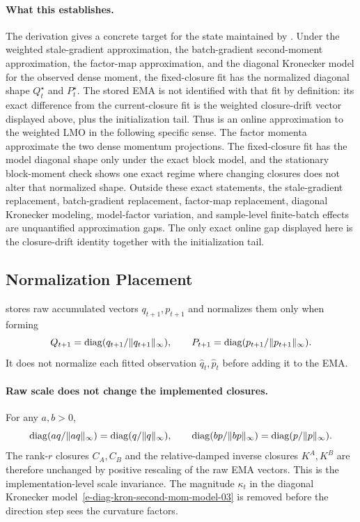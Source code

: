 \paragraph{What this establishes.}
The derivation gives a concrete target for the state maintained by
. Under the weighted stale-gradient approximation, the
batch-gradient second-moment approximation, the factor-map approximation, and
the diagonal Kronecker model for the observed dense moment, the fixed-closure
fit has the normalized diagonal shape $Q^\star_t$ and $P^\star_t$.
The stored EMA is not identified with that fit by definition: its exact
difference from the current-closure fit is the weighted closure-drift vector
displayed above, plus the initialization tail. Thus  is an
online approximation to the weighted LMO in the following specific sense. The
factor momenta approximate the two dense momentum projections. The fixed-closure
fit has the model diagonal shape only under the exact block model, and the
stationary block-moment check shows one exact regime where changing closures
does not alter that normalized shape. Outside these exact statements, the
stale-gradient replacement, batch-gradient replacement, factor-map replacement,
diagonal Kronecker modeling, model-factor variation, and sample-level
finite-batch effects are unquantified approximation gaps. The only exact online
gap displayed here is the closure-drift identity together with the initialization
tail.

\subsection{Normalization Placement}
\label{sec:scale-placement-03}

\methodname{} stores raw accumulated vectors $q_{t+1},p_{t+1}$ and normalizes
them only when forming
\[
  Q_{t+1}=\operatorname{diag}(q_{t+1}/\| q_{t+1}\|_\infty),
  \qquad
  P_{t+1}=\operatorname{diag}(p_{t+1}/\| p_{t+1}\|_\infty).
\]
It does not normalize each fitted observation $\hat q_t,\hat p_t$ before
adding it to the EMA.

\paragraph{Raw scale does not change the implemented closures.}
For any $a,b>0$,
\[
  \operatorname{diag}(aq/\| aq\|_\infty)=\operatorname{diag}(q/\| q\|_\infty),
  \qquad
  \operatorname{diag}(bp/\| bp\|_\infty)=\operatorname{diag}(p/\| p\|_\infty).
\]
The rank-$r$ closures $C_A,C_B$ and the relative-damped inverse closures
$K^A,K^B$ are therefore unchanged by
positive rescaling of the raw EMA vectors. This is the implementation-level
scale invariance. The magnitude $\kappa_t$ in the diagonal Kronecker
model~\eqref{e-diag-kron-second-mom-model-03} is removed before the
direction step sees the curvature factors.


